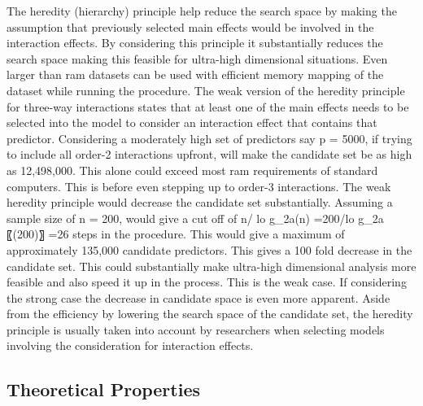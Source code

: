 \documentclass[]{book}
\theoremstyle{definition}
\theoremstyle{definition}
\theoremstyle{remark}
\begin{document}
The heredity (hierarchy) principle help reduce the search space by
making the assumption that previously selected main effects would be
involved in the interaction effects. By considering this principle it
substantially reduces the search space making this feasible for
ultra-high dimensional situations. Even larger than ram datasets can be
used with efficient memory mapping of the dataset while running the
procedure. The weak version of the heredity principle for three-way
interactions states that at least one of the main effects needs to be
selected into the model to consider an interaction effect that contains
that predictor. Considering a moderately high set of predictors say p =
5000, if trying to include all order-2 interactions upfront, will make
the candidate set be as high as 12,498,000. This alone could exceed most
ram requirements of standard computers. This is before even stepping up
to order-3 interactions. The weak heredity principle would decrease the
candidate set substantially. Assuming a sample size of n = 200, would
give a cut off of n/ lo g\_2a(n) =200/lo g\_2a〖(200)〗 =26 steps in the
procedure. This would give a maximum of approximately 135,000 candidate
predictors. This gives a 100 fold decrease in the candidate set. This
could substantially make ultra-high dimensional analysis more feasible
and also speed it up in the process. This is the weak case. If
considering the strong case the decrease in candidate space is even more
apparent. Aside from the efficiency by lowering the search space of the
candidate set, the heredity principle is usually taken into account by
researchers when selecting models involving the consideration for
interaction effects.

\subsection{Theoretical Properties}\label{theoretical-properties}
\end{document}
